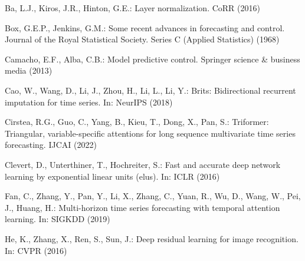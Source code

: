 \documentclass[runningheads]{llncs}
\begin{document}


















\begin{thebibliography}{10}
    \providecommand{\url}[1]{\texttt{#1}}
    \providecommand{\urlprefix}{URL }
    \providecommand{\doi}[1]{https://doi.org/#1}
    
    Ba, L.J., Kiros, J.R., Hinton, G.E.: Layer normalization. CoRR  (2016)
    
    Box, G.E.P., Jenkins, G.M.: Some recent advances in forecasting and control.
      Journal of the Royal Statistical Society. Series C (Applied Statistics)
      (1968)
    
    Camacho, E.F., Alba, C.B.: Model predictive control. Springer science \&
      business media (2013)
    
    Cao, W., Wang, D., Li, J., Zhou, H., Li, L., Li, Y.: Brits: Bidirectional
      recurrent imputation for time series. In: NeurIPS (2018)
    
    Cirstea, R.G., Guo, C., Yang, B., Kieu, T., Dong, X., Pan, S.: Triformer:
      Triangular, variable-specific attentions for long sequence multivariate time
      series forecasting. IJCAI  (2022)
    
    Clevert, D., Unterthiner, T., Hochreiter, S.: Fast and accurate deep network
      learning by exponential linear units (elus). In: ICLR (2016)
    
    Fan, C., Zhang, Y., Pan, Y., Li, X., Zhang, C., Yuan, R., Wu, D., Wang, W.,
      Pei, J., Huang, H.: Multi-horizon time series forecasting with temporal
      attention learning. In: SIGKDD (2019)
    
    He, K., Zhang, X., Ren, S., Sun, J.: Deep residual learning for image
      recognition. In: CVPR (2016)
    

\end{thebibliography}
\end{document}
